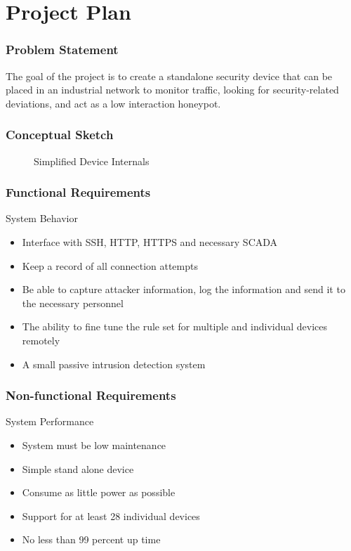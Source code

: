 \section{Project Plan}

\begin{frame}
\frametitle{Problem Statement}

The goal of the project is to create a standalone security device that can be placed in an industrial network to monitor traffic, looking for security-related deviations, and act as a low interaction honeypot.

\end{frame}

\begin{frame}
\frametitle{Conceptual Sketch}
\begin{figure}
\centering
{
\scalebox{0.7}{}
}
\caption{Simplified Device Internals}
\end{figure}
\end{frame}

\begin{frame}
\frametitle{Functional Requirements}
System Behavior
\begin{itemize}
\item Interface with SSH, HTTP, HTTPS and necessary SCADA 
\item Keep a record of all connection attempts
\item Be able to capture attacker information, log the information  and send it to the necessary personnel 
\item The ability to fine tune the rule set for multiple and individual devices remotely 
\item A small passive intrusion detection system 
\end{itemize}

\end{frame}

\begin{frame}
\frametitle{Non-functional Requirements}
System Performance
\begin{itemize}
\item System must be low maintenance
\item Simple stand alone device
\item Consume as little power as possible
\item Support for at least 28 individual devices
\item No less than 99 percent up time
\end{itemize}

\end{frame}

